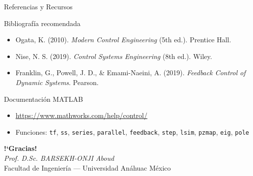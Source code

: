 \documentclass[aspectratio=169,xcolor=dvipsnames]{beamer}
\begin{document}
\begin{frame}{Referencias y Recursos}
    \begin{exampleblock}{Bibliograf\'ia recomendada}
        \begin{itemize}
            \item Ogata, K. (2010). \textit{Modern Control Engineering} (5th ed.). Prentice Hall.
            \item Nise, N. S. (2019). \textit{Control Systems Engineering} (8th ed.). Wiley.
            \item Franklin, G., Powell, J. D., \& Emami-Naeini, A. (2019). \textit{Feedback Control of Dynamic Systems}. Pearson.
        \end{itemize}
    \end{exampleblock}
    \vspace{0.3em}
    \begin{exampleblock}{Documentaci\'on MATLAB}
        \begin{itemize}
            \item \url{https://www.mathworks.com/help/control/}
            \item Funciones: \texttt{tf}, \texttt{ss}, \texttt{series}, \texttt{parallel}, \texttt{feedback}, \texttt{step}, \texttt{lsim}, \texttt{pzmap}, \texttt{eig}, \texttt{pole}
        \end{itemize}
    \end{exampleblock}
    \vspace{0.5em}
    \begin{center}
        \Large \textbf{!`Gracias!}\\[0.3em]
        \normalsize \textit{Prof. D.Sc. BARSEKH-ONJI Aboud}\\
        \small Facultad de Ingenier\'ia --- Universidad An\'ahuac M\'exico
    \end{center}
\end{frame}
\end{document}
